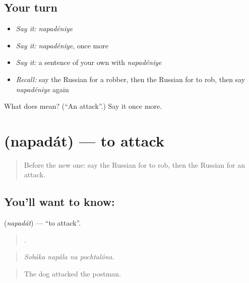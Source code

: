 \subsection*{Your turn}
\begin{itemize}
\raggedright
  \item \emph{Say it:} \emph{napadéniye}
  \item \emph{Say it:} \emph{napadéniye}, once more
  \item \emph{Say it:} a sentence of your own with \emph{napadéniye}
  \item \emph{Recall:} say the Russian for a robber, then the Russian for to rob, then say \emph{napadéniye} again
\end{itemize}

\begin{tcolorbox}[breakable,colback=teal!4,colframe=teal!35!black,title={Before you move on}]
What does  mean? (\textquotedblleft{}An attack\textquotedblright{}.) Say it once more.
\end{tcolorbox}
\section[\texorpdfstring{\ru{нападать} (napadát)}{нападать (napadát)}]{ (napadát) — to attack}

\label{lesson:RU-C289-napadat}



\begin{quote}
Before the new one: say the Russian for to rob, then the Russian for an attack.
\end{quote}

\subsection*{You'll want to know: }
\textbf{} (\emph{napadát}) — \textquotedblleft{}to attack\textquotedblright{}.

\begin{quote}
   .
\end{quote}

\begin{quote}
\emph{Sobáka napála na pochtalóna.}
\end{quote}

\begin{quote}
The dog attacked the postman.
\end{quote}

